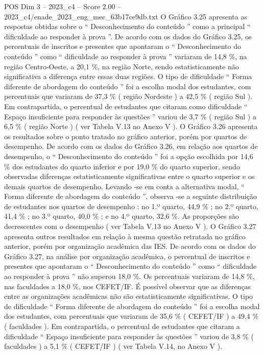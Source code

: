 \begin{textsample}{POS Dim 3 – 2023\_c4 – Score 2.00 – 2023\_c4/enade\_2023\_eng\_mec\_63b17ce9db.txt}
O Gráfico 3.25 apresenta as respostas obtidas sobre o “ Desconhecimento do conteúdo ” como a principal “ dificuldade ao responder à prova ”.
De acordo com os dados do Gráfico 3.25, os percentuais de inscritos e presentes que apontaram o “ Desconhecimento do conteúdo ” como “ dificuldade ao responder à prova ” variaram de 14,8 \%, na região Centro-Oeste, a 20,1 \%, na região Norte, sendo estatisticamente não significativa a diferença entre essas duas regiões.
O tipo de dificuldade “ Forma diferente de abordagem do conteúdo ” foi a escolha modal dos estudantes, com percentuais que variaram de 37,3 \% ( região Nordeste ) a 42,5 \% ( região Sul ).
Em contrapartida, o percentual de estudantes que citaram como dificuldade “ Espaço insuficiente para responder às questões ” variou de 3,7 \% ( região Sul ) a 6,5 \% ( região Norte ) ( ver Tabela V.13 no Anexo V ).
O Gráfico 3.26 apresenta os resultados sobre o ponto tratado no gráfico anterior, porém por quartos de desempenho.
De acordo com os dados do Gráfico 3.26, em relação aos quartos de desempenho, o “ Desconhecimento do conteúdo ” foi a opção escolhida por 14,6 \% dos estudantes do quarto inferior e por 19,0 \% do quarto superior, sendo observadas diferenças estatisticamente significativas entre o quarto superior e os demais quartos de desempenho.
Levando -se em conta a alternativa modal, “ Forma diferente de abordagem do conteúdo ”, observa -se a seguinte distribuição de estudantes nos quartos de desempenho : no 1.º quarto, 44,9 \% ; no 2.º quarto, 41,4 \% ; no 3.º quarto, 40,0 \% ; e no 4.º quarto, 32,6 \%.
As proporções são decrescentes com o desempenho ( ver Tabela V.13 no Anexo V ).
O Gráfico 3.27 apresenta outros resultados em relação à mesma questão retratada no gráfico anterior, porém por organização acadêmica das IES.
De acordo com os dados do Gráfico 3.27, na análise por organização acadêmica, o percentual de inscritos e presentes que apontaram o “ Desconhecimento do conteúdo ” como “ dificuldade ao responder à prova ” não superou 18,0 \%.
Os percentuais variaram de 14,8 \%, nas faculdades a 18,0 \%, nos CEFET/IF.
É possível observar que as diferenças entre as organizações acadêmicas não são estatisticamente significativas.
O tipo de dificuldade “ Forma diferente de abordagem do conteúdo ” foi a escolha modal dos estudantes, com percentuais que variaram de 35,6 \% ( CEFET/IF ) a 49,4 \% ( faculdades ).
Em contrapartida, o percentual de estudantes que citaram a dificuldade “ Espaço insuficiente para responder às questões ” variou de 3,8 \% ( faculdades ) a 5,1 \% ( CEFET/IF ) ( ver Tabela V.14, no Anexo V ).

\end{textsample}
